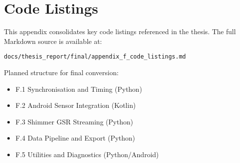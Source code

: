 \chapter{Code Listings}


This appendix consolidates key code listings referenced in the thesis. The full Markdown source is available at:
\begin{verbatim}
docs/thesis_report/final/appendix_f_code_listings.md
\end{verbatim}

Planned structure for final conversion:
\begin{itemize}
    \item F.1 Synchronisation and Timing (Python)
    \item F.2 Android Sensor Integration (Kotlin)
    \item F.3 Shimmer GSR Streaming (Python)
    \item F.4 Data Pipeline and Export (Python)
    \item F.5 Utilities and Diagnostics (Python/Android)
\end{itemize}
